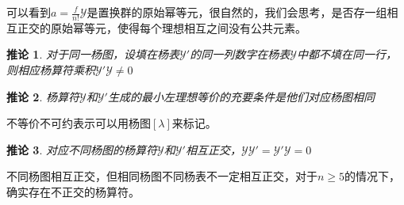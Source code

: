 \documentclass[12pt]{article}
\newtheorem{corollary}{推论}[subsection]
\begin{document}
可以看到$a=\frac{f}{n!}\mathcal{Y}$是置换群的原始幂等元，很自然的，我们会思考，是否存一组相互正交的原始幂等元，使得每个理想相互之间没有公共元素。
\begin{corollary}
    对于同一杨图，设填在杨表$\mathcal{Y}'$的同一列数字在杨表$\mathcal{Y}$中都不填在同一行，则相应杨算符乘积$\mathcal{Y}'\mathcal{Y}\neq0$
\end{corollary}
\begin{corollary}
    杨算符$\mathcal{Y}$和$\mathcal{Y}'$生成的最小左理想等价的充要条件是他们对应杨图相同
\end{corollary}
不等价不可约表示可以用杨图$[\lambda]$来标记。
\begin{corollary}
    对应不同杨图的杨算符$\mathcal{Y}$和$\mathcal{Y}'$相互正交，$\mathcal{Y}\mathcal{Y}'=\mathcal{Y}'\mathcal{Y}=0$
\end{corollary}
不同杨图相互正交，但相同杨图不同杨表不一定相互正交，对于$n\geq5$的情况下，确实存在不正交的杨算符。
\end{document}
